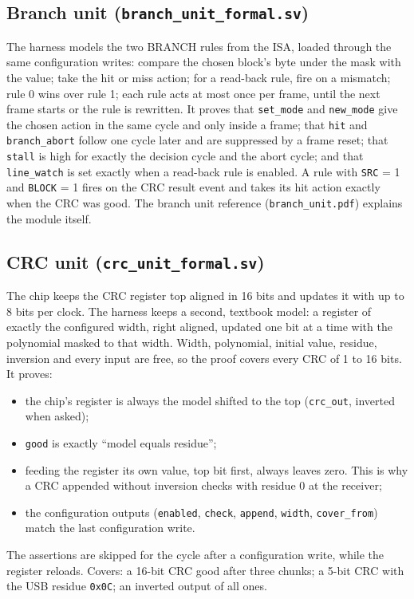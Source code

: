 \documentclass[11pt,a4paper]{article}
\newcommand{\file}[1]{\texttt{#1}}
\begin{document}
\subsection{Branch unit (\file{branch\_unit\_formal.sv})}
The harness models the two BRANCH rules from the ISA, loaded through the same configuration writes: compare the chosen block's byte under the mask with the value; take the hit or miss action; for a read-back rule, fire on a mismatch; rule 0 wins over rule 1; each rule acts at most once per frame, until the next frame starts or the rule is rewritten. It proves that \texttt{set\_mode} and \texttt{new\_mode} give the chosen action in the same cycle and only inside a frame; that \texttt{hit} and \texttt{branch\_abort} follow one cycle later and are suppressed by a frame reset; that \texttt{stall} is high for exactly the decision cycle and the abort cycle; and that \texttt{line\_watch} is set exactly when a read-back rule is enabled. A rule with \texttt{SRC} = 1 and \texttt{BLOCK} = 1 fires on the CRC result event and takes its hit action exactly when the CRC was good. The branch unit reference (\file{branch\_unit.pdf}) explains the module itself.

\subsection{CRC unit (\file{crc\_unit\_formal.sv})}
The chip keeps the CRC register top aligned in 16 bits and updates it with up to 8 bits per clock. The harness keeps a second, textbook model: a register of exactly the configured width, right aligned, updated one bit at a time with the polynomial masked to that width. Width, polynomial, initial value, residue, inversion and every input are free, so the proof covers every CRC of 1 to 16 bits. It proves:
\begin{itemize}
\item the chip's register is always the model shifted to the top (\texttt{crc\_out}, inverted when asked);
\item \texttt{good} is exactly ``model equals residue'';
\item feeding the register its own value, top bit first, always leaves zero. This is why a CRC appended without inversion checks with residue 0 at the receiver;
\item the configuration outputs (\texttt{enabled}, \texttt{check}, \texttt{append}, \texttt{width}, \texttt{cover\_from}) match the last configuration write.
\end{itemize}
The assertions are skipped for the cycle after a configuration write, while the register reloads. Covers: a 16-bit CRC good after three chunks; a 5-bit CRC with the USB residue \texttt{0x0C}; an inverted output of all ones.
\end{document}

